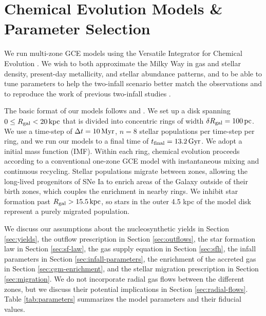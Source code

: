 \documentclass[twocolumn,twocolappendix]{aastex701}
\newcommand{\kpc}{\,{\rm kpc}}
\begin{document}
\section{Chemical Evolution Models \& Parameter Selection}
\label{sec:methods}

We run multi-zone GCE models using the Versatile Integrator for Chemical Evolution \citep[{\tt VICE};][]{johnson_impact_2020}. We wish to both approximate the Milky Way in gas and stellar density, present-day metallicity, and stellar abundance patterns, and to be able to tune parameters to help the two-infall scenario better match the observations and to reproduce the work of previous two-infall studies \citep[e.g.,][]{spitoni_galactic_2019,spitoni_apogee_2021,spitoni_remind_2024,palla_chemical_2020}.

The basic format of our models follows \citet{johnson_stellar_2021} and \citet{dubay_galactic_2024}. We set up a disk spanning $0\leq R_{\rm gal}<20\kpc$ that is divided into concentric rings of width $\delta R_{\rm gal}=100\,{\rm pc}$. We use a time-step of $\Delta t=10\,{\rm Myr}$, $n=8$ stellar populations per time-step per ring, and we run our models to a final time of $t_{\rm final}=13.2\,{\rm Gyr}$. We adopt a \citet{kroupa_variation_2001} initial mass function (IMF). Within each ring, chemical evolution proceeds according to a conventional one-zone GCE model with instantaneous mixing and continuous recycling. Stellar populations migrate between zones, allowing the long-lived progenitors of SNe Ia to enrich areas of the Galaxy outside of their birth zones, which couples the enrichment in nearby rings. We inhibit star formation past $R_{\rm gal}>15.5\kpc$, so stars in the outer 4.5 kpc of the model disk represent a purely migrated population.

We discuss our assumptions about the nucleosynthetic yields in Section \ref{sec:yields}, the outflow prescription in Section \ref{sec:outflows}, the star formation law in Section \ref{sec:sf-law}, the gas supply equation in Section \ref{sec:sfh}, the infall parameters in Section \ref{sec:infall-parameters}, the enrichment of the accreted gas in Section \ref{sec:cgm-enrichment}, and the stellar migration prescription in Section \ref{sec:migration}. We do not incorporate radial gas flows between the different zones, but we discuss their potential implications in Section \ref{sec:radial-flows}. Table \ref{tab:parameters} summarizes the model parameters and their fiducial values.
\end{document}
